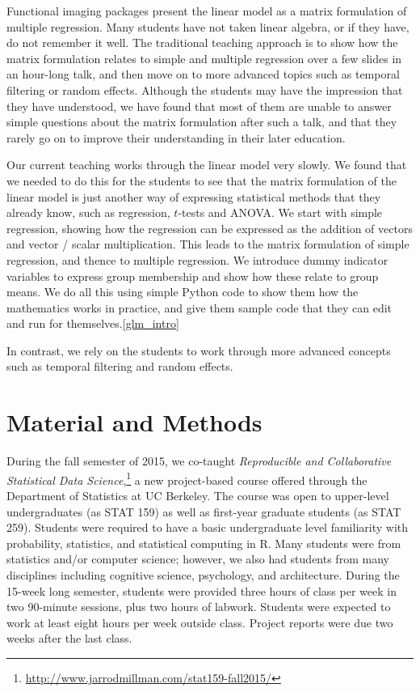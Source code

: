 Functional imaging packages present the linear model as a matrix formulation
of multiple regression.  Many students have not taken linear algebra, or if
they have, do not remember it well.  The traditional teaching approach is to
show how the matrix formulation relates to simple and multiple regression over
a few slides in an hour-long talk, and then move on to more advanced topics
such as temporal filtering or random effects.  Although the students may have
the impression that they have understood, we have found that most of them are
unable to answer simple questions about the matrix formulation after such a
talk, and that they rarely go on to improve their understanding in their later
education.

Our current teaching works through the linear model very slowly. We found that
we needed to do this for the students to see that the matrix formulation of
the linear model is just another way of expressing statistical methods that
they already know, such as regression, $t$-tests and ANOVA.  We start with
simple regression, showing how the regression can be expressed as the addition
of vectors and vector / scalar multiplication.  This leads to the matrix
formulation of simple regression, and thence to multiple regression.  We
introduce dummy indicator variables to express group membership and show how
these relate to group means.  We do all this using simple Python code to show
them how the mathematics works in practice, and give them sample code that
they can edit and run for themselves.\cref{glm_intro}

In contrast, we rely on the students to work through more advanced concepts
such as temporal filtering and random effects.

\section{Material and Methods}\label{methods}

During the fall semester of 2015, we co-taught \emph{Reproducible and Collaborative
Statistical Data Science},\footnote{\url{http://www.jarrodmillman.com/stat159-fall2015/}}
a new project-based course offered through the Department of Statistics at UC Berkeley.
The course was open to upper-level undergraduates (as STAT 159) as well as
first-year graduate students (as STAT 259).
Students were required to have a basic undergraduate level familiarity with
probability, statistics, and statistical computing in R.
Many students were from statistics and/or computer science; however, we also
had students from many disciplines including cognitive science, psychology, and
architecture.
During the 15-week long semester, students were provided three hours of class
per week in two 90-minute sessions, plus two hours of labwork.
Students were expected to work at least eight hours per week outside class.
Project reports were due two weeks after the last class.


